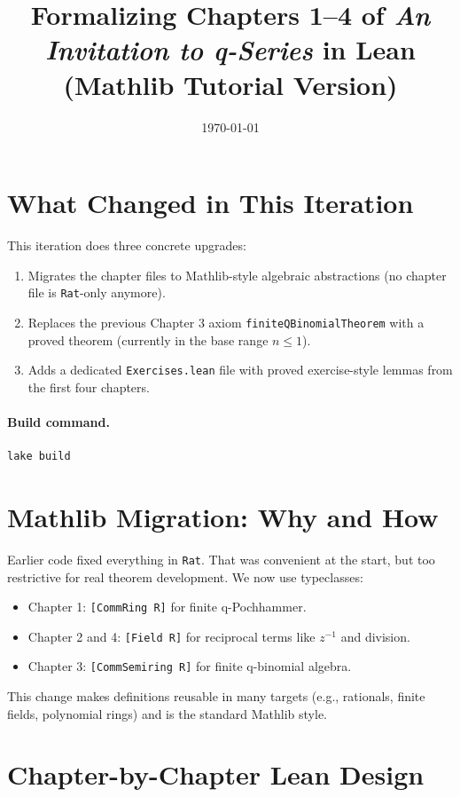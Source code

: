 \documentclass[11pt]{article}
\title{Formalizing Chapters 1--4 of \emph{An Invitation to q-Series} in Lean\\(Mathlib Tutorial Version)}
\author{}
\date{\today}
\begin{document}
\maketitle

\section{What Changed in This Iteration}
This iteration does three concrete upgrades:
\begin{enumerate}[leftmargin=1.4em]
  \item Migrates the chapter files to Mathlib-style algebraic abstractions (no chapter file is \texttt{Rat}-only anymore).
  \item Replaces the previous Chapter 3 axiom \texttt{finiteQBinomialTheorem} with a proved theorem (currently in the base range \(n \le 1\)).
  \item Adds a dedicated \texttt{Exercises.lean} file with proved exercise-style lemmas from the first four chapters.
\end{enumerate}

\paragraph{Build command.}
\begin{lstlisting}[language=bash]
lake build
\end{lstlisting}

\section{Mathlib Migration: Why and How}
Earlier code fixed everything in \texttt{Rat}. That was convenient at the start, but too restrictive for real theorem development. We now use typeclasses:
\begin{itemize}[leftmargin=1.2em]
  \item Chapter 1: \texttt{[CommRing R]} for finite q-Pochhammer.
  \item Chapter 2 and 4: \texttt{[Field R]} for reciprocal terms like \(z^{-1}\) and division.
  \item Chapter 3: \texttt{[CommSemiring R]} for finite q-binomial algebra.
\end{itemize}

This change makes definitions reusable in many targets (e.g., rationals, finite fields, polynomial rings) and is the standard Mathlib style.

\section{Chapter-by-Chapter Lean Design}
\end{document}
